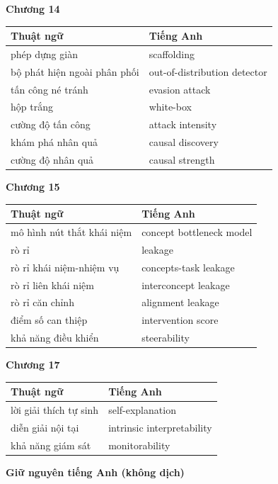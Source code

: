 \medskip

\textbf{Chương 14}

\begin{tabular}{@{}lp{7cm}@{}}
\toprule
Thuật ngữ & Tiếng Anh \\
\midrule
phép dựng giàn & scaffolding \\
bộ phát hiện ngoài phân phối & out-of-distribution detector \\
tấn công né tránh & evasion attack \\
hộp trắng & white-box \\
cường độ tấn công & attack intensity \\
khám phá nhân quả & causal discovery \\
cường độ nhân quả & causal strength \\
\bottomrule
\end{tabular}

\medskip

\textbf{Chương 15}

\begin{tabular}{@{}lp{7cm}@{}}
\toprule
Thuật ngữ & Tiếng Anh \\
\midrule
mô hình nút thắt khái niệm & concept bottleneck model \\
rò rỉ & leakage \\
rò rỉ khái niệm-nhiệm vụ & concepts-task leakage \\
rò rỉ liên khái niệm & interconcept leakage \\
rò rỉ căn chỉnh & alignment leakage \\
điểm số can thiệp & intervention score \\
khả năng điều khiển & steerability \\
\bottomrule
\end{tabular}

\medskip

\textbf{Chương 17}

\begin{tabular}{@{}lp{7cm}@{}}
\toprule
Thuật ngữ & Tiếng Anh \\
\midrule
lời giải thích tự sinh & self-explanation \\
diễn giải nội tại & intrinsic interpretability \\
khả năng giám sát & monitorability \\
\bottomrule
\end{tabular}

\medskip

\textbf{Giữ nguyên tiếng Anh (không dịch)}

